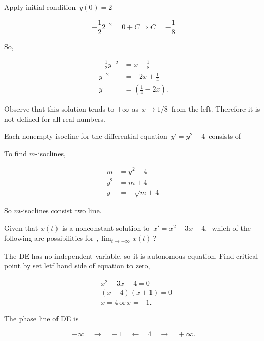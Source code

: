 \begin{itemize}
  Apply initial condition $\, y(0) = 2 \,$

  \begin{equation*}
    - \frac{1}{2} 2^{-2} = 0 + C \Rightarrow C = - \frac{1}{8}
  \end{equation*}

  So,

  \begin{align*}
    - \frac{1}{2} y^{-2} &= x  - \frac{1}{8} \\
    y^{-2} &= -2x + \frac{1}{4} \\
    y & = \left( \frac{1}{4} - 2x \right). 
  \end{align*}

  Observe that this solution tends to $ + \infty $ as $\, x \to 1/8 \, $ from the left.
  Therefore it is not defined for all real numbers.
\end{itemize}

\begin{problem}
  Each nonempty isocline for the differential equation $\, y' = y^2 - 4 \, $
  consists of 
\end{problem}

To find $m$-isoclines,

\begin{align*}
  m &= y^2 - 4 \\
  y^2 &= m + 4 \\
  y &= \pm \sqrt{m + 4}
\end{align*}

So $m$-isoclines consist two line.

\begin{problem}
  Given that $x(t)$ is a nonconstant solution to $\, x' = x^2 - 3x -4,\,$
  which of the following are possibilities for $, \lim_{t \to + \infty} x(t)\,$?
\end{problem}

The DE has no independent variable, so it is autonomous equation.
Find critical point by set letf hand side of equation to zero,

\begin{align*}
  & x^2 - 3x - 4 = 0 \\
  &(x - 4)(x + 1 )= 0 \\
  & x = 4 \, \text{or} \, x = -1.  
\end{align*}

The phase line of DE is

\begin{equation*}
  -\infty \quad \longrightarrow \quad -1 \quad
  \longleftarrow \quad 4 \quad \longrightarrow \quad +\infty .
\end{equation*}

